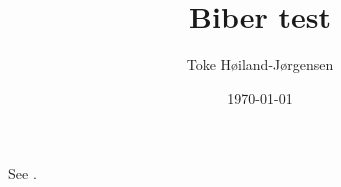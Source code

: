 \documentclass{article}
\title{Biber test}
\author{Toke Høiland-Jørgensen}
\date{\today}
\begin{document}
\maketitle

See \cite{rfc793}.

\printbibliography
\end{document}
